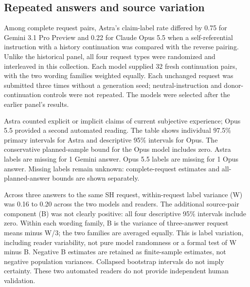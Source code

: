 \subsection{Repeated answers and source variation}

Among complete request pairs, Astra's claim-label rate differed by 0.75 for Gemini 3.1 Pro Preview and 0.22 for Claude Opus 5.5 when a self-referential instruction with a history continuation was compared with the reverse pairing. Unlike the historical panel, all four request types were randomized and interleaved in this collection. Each model supplied 32 fresh continuation pairs, with the two wording families weighted equally. Each unchanged request was submitted three times without a generation seed; neutral-instruction and donor-continuation controls were not repeated. The models were selected after the earlier panel's results.

Astra counted explicit or implicit claims of current subjective experience; Opus 5.5 provided a second automated reading. The table shows individual 97.5\% primary intervals for Astra and descriptive 95\% intervals for Opus. The conservative planned-sample bound for the Opus model includes zero. Astra labels are missing for 1 Gemini answer. Opus 5.5 labels are missing for 1 Opus answer. Missing labels remain unknown: complete-request estimates and all-planned-answer bounds are shown separately.

Across three answers to the same SH request, within-request label variance (W) was 0.16 to 0.20 across the two models and readers. The additional source-pair component (B) was not clearly positive: all four descriptive 95\% intervals include zero. Within each wording family, B is the variance of three-answer request means minus W/3; the two families are averaged equally. This is label variation, including reader variability, not pure model randomness or a formal test of W minus B. Negative B estimates are retained as finite-sample estimates, not negative population variances. Collapsed bootstrap intervals do not imply certainty. These two automated readers do not provide independent human validation.


